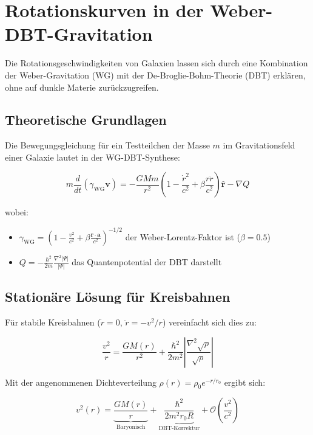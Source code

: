 \section{Rotationskurven in der Weber-DBT-Gravitation}
Die Rotationsgeschwindigkeiten von Galaxien lassen sich durch eine Kombination der Weber-Gravitation (WG) mit der De-Broglie-Bohm-Theorie (DBT) erklären, ohne auf dunkle Materie zurückzugreifen. 

\subsection{Theoretische Grundlagen}
Die Bewegungsgleichung für ein Testteilchen der Masse $m$ im Gravitationsfeld einer Galaxie lautet in der WG-DBT-Synthese:

\begin{equation}
m \frac{d}{dt}(\gamma_{\text{WG}} \mathbf{v}) = -\frac{GMm}{r^2}\left(1 - \frac{\dot{r}^2}{c^2} + \beta \frac{r\ddot{r}}{c^2}\right)\hat{\mathbf{r}} - \nabla Q
\end{equation}

wobei:
\begin{itemize}
\item $\gamma_{\text{WG}} = \left(1 - \frac{v^2}{c^2} + \beta \frac{\mathbf{r}\cdot\mathbf{a}}{c^2}\right)^{-1/2}$ der Weber-Lorentz-Faktor ist ($\beta = 0.5$)
\item $Q = -\frac{\hbar^2}{2m}\frac{\nabla^2|\Psi|}{|\Psi|}$ das Quantenpotential der DBT darstellt
\end{itemize}

\subsection{Stationäre Lösung für Kreisbahnen}
Für stabile Kreisbahnen ($\dot{r} = 0$, $\ddot{r} = -v^2/r$) vereinfacht sich dies zu:

\begin{equation}
\frac{v^2}{r} = \frac{GM(r)}{r^2} + \frac{\hbar^2}{2m^2}\left|\frac{\nabla^2\sqrt{\rho}}{\sqrt{\rho}}\right|
\end{equation}

Mit der angenommenen Dichteverteilung $\rho(r) = \rho_0 e^{-r/r_0}$ ergibt sich:

\begin{equation}
v^2(r) = \underbrace{\frac{GM(r)}{r}}_{\text{Baryonisch}} + \underbrace{\frac{\hbar^2}{2m^2 r_0 R}}_{\text{DBT-Korrektur}} + \mathcal{O}\left(\frac{v^2}{c^2}\right)
\end{equation}

